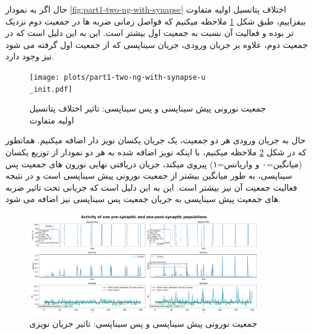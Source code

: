 \documentclass{report}
\begin{document}
        حال اگر به نمودار 
        \ref{fig:part1-two-ng-with-synapse}
        اختلاف پتانسیل اولیه متفاوت بیفزاییم، طبق شکل 
        \ref{fig:part1-two-ng-with-synapse-u-init}
        ملاحظه میکنیم که فواصل زمانی ضربه ها در جمعیت دوم نزدیک تر بوده و فعالیت آن نسبت به جمعیت اول بیشتر است. این به این دلیل است که در جمعیت دوم، علاوه بر جریان ورودی، جریان سیناپسی که از جمعیت اول گرفته می شود نیز وجود دارد.
        \begin{figure}[!ht]
            \centering
            \texttt{[image: plots/part1-two-ng-with-synapse-u\\\_init.pdf]} 
            \caption{جمعیت نورونی پیش سیناپسی و پس سیناپسی: تاثیر اختلاف پتانسیل اولیه متفاوت}
            \label{fig:part1-two-ng-with-synapse-u-init}
        \end{figure}

        حال به جریان ورودی هر دو جمعیت، یک جریان یکسان نویز دار اضافه میکنیم. همانطور که در شکل
        \ref{fig:part1-two-ng-with-synapse-noise-curr}
        ملاحظه میکنیم، با اینکه نویز اضافه شده به هر دو نمودار از توزیع یکسان
        (میانگین=۰ و واریانس=۱)
        پیروی میکند، جریان دریافتی نهایی نورون های جمعیت پس سیناپسی، به طور میانگین بیشتر از جمعیت نورونی پیش سیناپسی است و در نتیجه فعالیت جمعیت آن نیز بیشتر است. این به این دلیل است که جریانی تحت تاثیر ضربه های جمعیت پیش سیناپسی به جریان جمعیت پس سیناپسی نیز اضافه می شود.
        \begin{figure}[!ht]
            \centering
            \includegraphics[width=0.9\textwidth]{plots/part1-two-ng-with-synapse-noise-curr.pdf} 
            \caption{جمعیت نورونی پیش سیناپسی و پس سیناپسی: تاثیر جریان نویزی}
            \label{fig:part1-two-ng-with-synapse-noise-curr}
        \end{figure}
\end{document}
